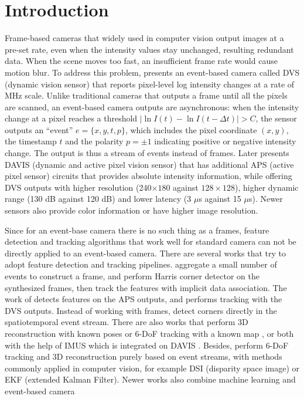 \chapter{Introduction}
\label{sec:introduction}

Frame-based cameras that widely used in computer vision output images
at a pre-set rate, even when the intensity values stay unchanged,
resulting redundant data. When the scene moves too fast, an
insufficient frame rate would cause motion blur. To address this
problem, \citet{lichtsteiner2008128} presents an event-based camera
called DVS (dynamic vision sensor) that reports pixel-level log
intensity changes at a rate of \unit{MHz} scale. Unlike traditional
cameras that outputs a frame until all the pixels are scanned, an
event-based camera outputs are asynchronous: when the intensity change
at a pixel reaches a threshold
$\mid\ln{I(t)}-\ln{I(t-\Delta t)}\mid>C$, the sensor outputs an
``event'' $e=\{x,y,t,p\}$, which includes the pixel coordinate
$(x, y)$, the timestamp $t$ and the polarity $p=\pm1$ indicating
positive or negative intensity change. The output is thus a stream of
events instead of frames. Later \citet{brandli2014240} presents DAVIS
(dynamic and active pixel vision sensor) that has additional APS
(active pixel sensor) circuits that provides absolute intensity
information, while offering DVS outputs with higher resolution
(240$\times180$ against $128\times128$), higher dynamic range (130 dB
against 120 dB) and lower latency (3 $\mu$s against 15 $\mu$s). Newer
sensors also provide color
information\citep{li2015design,moeys2018sensitive} or have higher
image resolution\citep{son20174}.

Since for an event-base camera there is no such thing as a frames,
feature detection and tracking algorithms that work well for standard
camera can not be directly applied to an event-based camera. There are
several works that try to adopt feature detection and tracking
pipelines. \citet{zhu2017event} aggregate a small number of events to
construct a frame, and perform Harris corner detector
\citep{harris1988combined} on the synthesized frames, then track the
features with implicit data association. The work of
\citet{tedaldi2016feature} detects features on the APS outputs, and
performs tracking with the DVS outputs. Instead of working with
frames, \citet{mueggler2017fast} detect corners directly in the
spatiotemporal event stream. There are also works that perform 3D
reconstruction with known poses \citep{rebecq2016emvs} or 6-DoF
tracking with a known map \citep{gallego2017event}, or both with the
help of IMUS which is integrated on DAVIS
\citep{rebecq2017real}. Besides, \citep{kim2016real,rebecq2017evo}
perform 6-DoF tracking and 3D reconstruction purely based on event
streams, with methods commonly applied in computer vision, for example
DSI (disparity space image) or EKF (extended Kalman Filter). Newer
works also combine machine learning and event-based camera
\citep{orchard2015hfirst,maqueda2018event,zhu2018ev}


